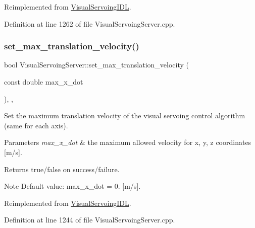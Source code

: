 Reimplemented from \hyperlink{classVisualServoingIDL_ad2495422c8f1dda27b85db96c42a7042}{Visual\+Servoing\+I\+DL}.



Definition at line 1262 of file Visual\+Servoing\+Server.\+cpp.

\mbox{\label{classVisualServoingServer_a393d1a1d1a7a68fc2098a7c7e8724cc9}} 
\subsubsection{\texorpdfstring{set\+\_\+max\+\_\+translation\+\_\+velocity()}{set\_max\_translation\_velocity()}}
{\footnotesize\ttfamily bool Visual\+Servoing\+Server\+::set\+\_\+max\+\_\+translation\+\_\+velocity (\begin{DoxyParamCaption}\item[{const double}]{max\+\_\+x\+\_\+dot }\end{DoxyParamCaption})\hspace{0.3cm}{\ttfamily [override]}, {\ttfamily [protected]}, {\ttfamily [virtual]}}



Set the maximum translation velocity of the visual servoing control algorithm (same for each axis). 


\begin{DoxyParams}{Parameters}
{\em max\+\_\+x\+\_\+dot} & the maximum allowed velocity for x, y, z coordinates \mbox{[}m/s\mbox{]}. \\
\hline
\end{DoxyParams}
\begin{DoxyReturn}{Returns}
true/false on success/failure. 
\end{DoxyReturn}
\begin{DoxyNote}{Note}
Default value\+: max\+\_\+x\+\_\+dot = 0. \mbox{[}m/s\mbox{]}. 
\end{DoxyNote}


Reimplemented from \hyperlink{classVisualServoingIDL_af928c1409ad82c6b5fa1aff93ef9d0c4}{Visual\+Servoing\+I\+DL}.



Definition at line 1244 of file Visual\+Servoing\+Server.\+cpp.

